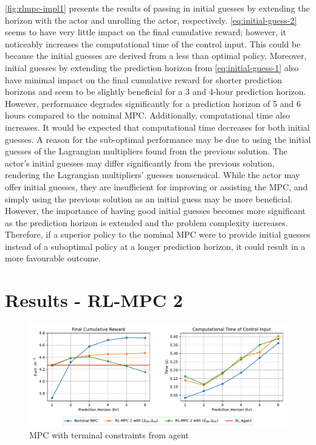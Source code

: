 \autoref{fig:rlmpc-impl1} presents the results of passing in initial guesses by extending the horizon with the actor and unrolling the actor, respectively. \autoref{eq:initial-guess-2} seems to have very little impact on the final cumulative reward; however, it noticeably increases the computational time of the control input. This could be because the initial guesses are derived from a less than optimal policy. Moreover, initial guesses by extending the prediction horizon from \autoref{eq:initial-guess-1} also have minimal impact on the final cumulative reward for shorter prediction horizons and seem to be slightly beneficial for a 3 and 4-hour prediction horizon. However, performance degrades significantly for a prediction horizon of 5 and 6 hours compared to the nominal MPC. Additionally, computational time also increases. It would be expected that computational time decreases for both initial guesses. A reason for the sub-optimal performance may be due to using the initial guesses of the Lagrangian multipliers found from the previous solution. The actor's initial guesses may differ significantly from the previous solution, rendering the Lagrangian multipliers' guesses nonsensical. While the actor may offer initial guesses, they are insufficient for improving or assisting the MPC, and simply using the previous solution as an initial guess may be more beneficial. However, the importance of having good initial guesses becomes more significant as the prediction horizon is extended and the problem complexity increases. Therefore, if a superior policy to the nominal MPC were to provide initial guesses instead of a suboptimal policy at a longer prediction horizon, it could result in a more favourable outcome.

\section{Results - RL-MPC 2}

\begin{figure}[H]
	\centering
	\includegraphics[width=\textwidth]{figures/rl_mpc_impl_2.pdf}
	\caption{MPC with terminal constraints from agent}
	\label{fig:rlmpc-impl2}
\end{figure}

